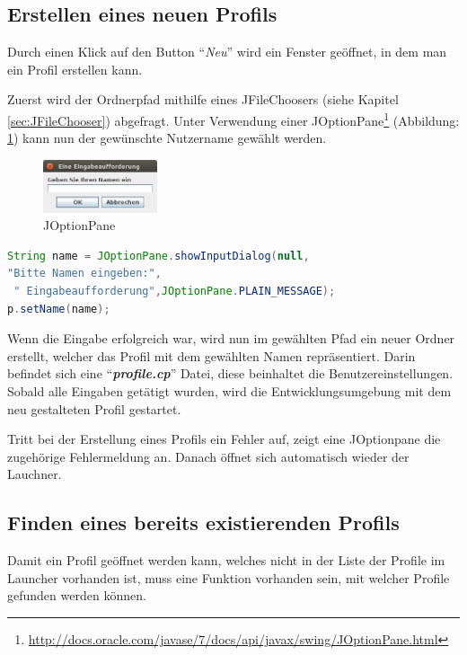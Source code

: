 \subsection{Erstellen eines neuen Profils}
Durch einen Klick auf den Button "`\textit{Neu}"' wird ein Fenster geöffnet, in dem man ein Profil erstellen kann.  

Zuerst wird der Ordnerpfad mithilfe eines JFileChoosers (siehe Kapitel \ref{sec:JFileChooser}) abgefragt. Unter Verwendung einer JOptionPane\footnote{\url{http://docs.oracle.com/javase/7/docs/api/javax/swing/JOptionPane.html}}  (Abbildung: \ref{fig:JOptionPane}) kann nun der gewünschte Nutzername gewählt werden.
\begin{figure}[h] 
   \centering
     \includegraphics[width=0.3\textwidth]{./media/images/gui/launcher/JOptionPane.png}
  \caption{JOptionPane}
  \label{fig:JOptionPane}
\end{figure}

\begin{lstlisting}[language=JAVA]
String name = JOptionPane.showInputDialog(null,
"Bitte Namen eingeben:",
 " Eingabeaufforderung",JOptionPane.PLAIN_MESSAGE);
p.setName(name);
\end{lstlisting}

Wenn die Eingabe erfolgreich war, wird nun im gewählten Pfad ein neuer Ordner erstellt, welcher das Profil mit dem gewählten Namen repräsentiert. Darin befindet sich eine "`\textit{\textbf{profile.cp}}"' Datei, diese beinhaltet die Benutzereinstellungen. Sobald alle Eingaben getätigt wurden, wird die Entwicklungsumgebung mit dem neu gestalteten Profil gestartet.

Tritt bei der Erstellung eines Profils ein Fehler auf, zeigt eine JOptionpane die zugehörige Fehlermeldung an. Danach öffnet sich automatisch wieder der Lauchner. 

\subsection{Finden eines bereits existierenden Profils}
Damit ein Profil geöffnet werden kann, welches nicht in der Liste der Profile im Launcher vorhanden ist, muss eine Funktion vorhanden sein, mit welcher Profile gefunden werden können.

